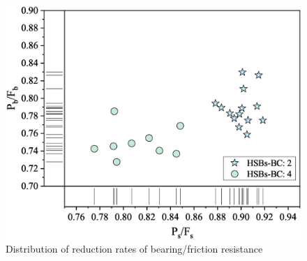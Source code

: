 \begin{figure}
    \centering
    \includegraphics[width=0.85\linewidth]{imgs/ch7/RF-pspb.eps}
    \caption{Distribution of reduction rates of bearing/friction resistance}
    \label{fig-dist-RF}
\end{figure}

